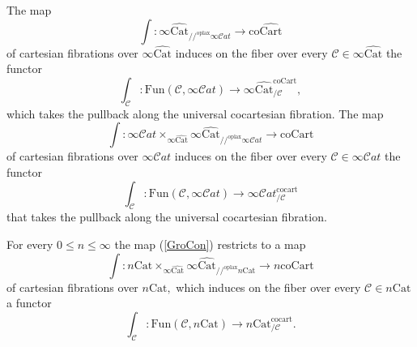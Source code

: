\documentclass[10pt,oneside]{article}
\numberwithin{equation}{section} %
\numberwithin{figure}{section} %
\theoremstyle{plain}
\theoremstyle{definition}
\newcommand{\mC}{{\mathcal C}}
\newcommand{\co}{\mathrm{co}}
\newcommand{\Cat}{\mathrm{Cat}}
\newcommand{\Fun}{\mathrm{Fun}}
\newcommand{\cocart}{{\mathrm{cocart}}}
\newcommand{\Cart}{{\mathrm{Cart}}}
\newcommand{\oplax}{{\mathrm{oplax}}}
\newcommand{\coCart}{{\mathrm{coCart}}}
\newcommand{\scat}{\mathcal{C}\mathit{at}}
\begin{document}
\begin{remark}
The map $$\int: \infty\widehat{\Cat}_{//^\oplax \infty\scat} \to \co\widehat{\Cart}$$ of cartesian fibrations over
$\infty\widehat{\Cat}$ induces on the fiber over every $\mC \in \infty\widehat{\Cat}$ the functor
$$\int_\mC: \Fun(\mC, \infty\scat) \to \infty\widehat{\Cat}^\coCart_{/\mC}, $$
which takes the pullback along the universal cocartesian fibration.
The map 
\begin{equation}\label{GroCon}
\int: \infty\scat \times_{\infty\widehat{\Cat}} \infty\widehat{\Cat}_{//^\oplax \infty\scat} \to \coCart
\end{equation} of cartesian fibrations over $\infty\scat$ induces on the fiber over every $\mC \in \infty\scat$ the functor
$$\int_\mC : \Fun(\mC, \infty\scat) \to \infty\scat^\cocart_{/\mC}$$
that takes the pullback along the universal cocartesian fibration.

\end{remark}

\begin{remark}

For every $ 0 \leq n \leq \infty$ the map (\ref{GroCon}) restricts to a map $$\int: n\Cat \times_{\infty\widehat{\Cat}} \infty\widehat{\Cat}_{//^\oplax n\Cat} \to {n\coCart}$$ of cartesian fibrations over $n\Cat,$ which induces on the fiber over every $\mC \in {n\Cat}$ a functor 
$$\int_\mC: \Fun(\mC, n\Cat) \to {n\Cat}^\cocart_{/\mC}.$$
\end{remark}
\end{document}
